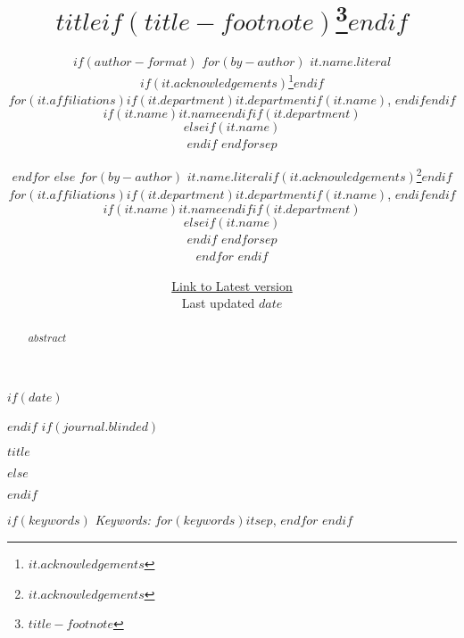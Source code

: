 \def\spacingset#1{\renewcommand{\baselinestretch}%
{#1}\small\normalsize} \spacingset{1}



$if(date)$
\date{\href{https://hchulkim.github.io}{Link to Latest version}\\ \vspace{1em} Last updated $date$}
$endif$
$if(journal.blinded)$
\spacingset{.8}
\bigskip
\bigskip
\bigskip
\begin{center}
  {\LARGE $title$}
\end{center}
\smallskip
\bigskip
\spacingset{1}
$else$
\title{$title$$if(title-footnote)$\thanks{$title-footnote$}$endif$}
\author{
$if(author-format)$
$for(by-author)$
$it.name.literal$$if(it.acknowledgements)$\thanks{$it.acknowledgements$}$endif$\\
$for(it.affiliations)$$if(it.department)$$it.department$$if(it.name)$, $endif$$endif$$if(it.name)$$it.name$$endif$$if(it.department)$\\$elseif(it.name)$\\$endif$
$endfor$$sep$\and $endfor$
$else$
$for(by-author)$
$it.name.literal$$if(it.acknowledgements)$\thanks{$it.acknowledgements$}$endif$\\
$for(it.affiliations)$$if(it.department)$$it.department$$if(it.name)$, $endif$$endif$$if(it.name)$$it.name$$endif$$if(it.department)$\\$elseif(it.name)$\\$endif$
$endfor$$sep$\\$endfor$
$endif$}
\maketitle
$endif$

\bigskip
\bigskip
\begin{abstract}
$abstract$
\end{abstract}

\bigskip
$if(keywords)$
\noindent%
{\it Keywords:} $for(keywords)$$it$$sep$, $endfor$
\vfill
$endif$

\newpage
\spacingset{1.2} %
